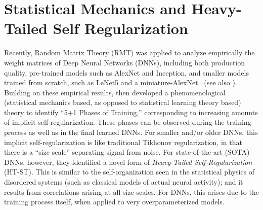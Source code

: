 \documentclass{article}
\begin{document}
\section{Statistical Mechanics and Heavy-Tailed Self Regularization}

%
%
%
%

Recently, Random Matrix Theory (RMT) was applied to analyze empirically the weight matrices of Deep Neural Networks (DNNs), including both production quality, pre-trained models such as AlexNet and Inception, and smaller models trained from scratch, such as LeNet5 and a miniature-AlexNet~\citep{MM18_TR} (see also \citep{MM17_TR, MM18_TR, MM19_HTSR_ICML, MM20_SDM, MM19_KDD}).
Building on these empirical results, 
\citet{MM18_TR} then developed a phenomenological (statistical mechanics based, as opposed to statistical learning theory based) theory to identify ``5+1 Phases of Training,'' corresponding to increasing amounts of implicit self-regularization.
These phases can be observed during the training process as well as in the final learned DNNs.
For smaller and/or older DNNs, this implicit self-regularization is like traditional Tikhonov regularization, in that there is a ``size scale'' separating signal from noise.
For state-of-the-art (SOTA) DNNs, however, they identified a novel form of \emph{Heavy-Tailed Self-Regularization} (HT-ST).
This is similar to the self-organization seen in the statistical physics of disordered systems (such as classical models of actual neural activity); and 
it results from correlations arising at all size scales.
For DNNs, this arises due to the training process itself, when applied to very overparameterized models.
\end{document}
